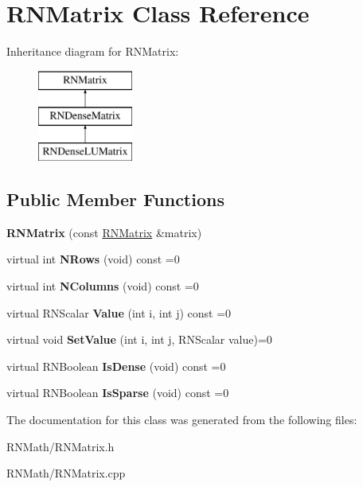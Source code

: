 \hypertarget{class_r_n_matrix}{}\section{R\+N\+Matrix Class Reference}
\label{class_r_n_matrix}
Inheritance diagram for R\+N\+Matrix\+:\begin{figure}[H]
\begin{center}
\leavevmode
\includegraphics[height=3.000000cm]{class_r_n_matrix}
\end{center}
\end{figure}
\subsection*{Public Member Functions}
\begin{DoxyCompactItemize}
\item 
{\bfseries R\+N\+Matrix} (const \hyperlink{class_r_n_matrix}{R\+N\+Matrix} \&matrix)\hypertarget{class_r_n_matrix_a98caf37cbca0dd338106f78c837d3841}{}\label{class_r_n_matrix_a98caf37cbca0dd338106f78c837d3841}

\item 
virtual int {\bfseries N\+Rows} (void) const  =0\hypertarget{class_r_n_matrix_ac6109cf146fa983646783ba2d96a990b}{}\label{class_r_n_matrix_ac6109cf146fa983646783ba2d96a990b}

\item 
virtual int {\bfseries N\+Columns} (void) const  =0\hypertarget{class_r_n_matrix_a822a97aa638e9efafd6a9aebfedec4f9}{}\label{class_r_n_matrix_a822a97aa638e9efafd6a9aebfedec4f9}

\item 
virtual R\+N\+Scalar {\bfseries Value} (int i, int j) const  =0\hypertarget{class_r_n_matrix_a30ef263fdb3f0b862d75936efc973e0f}{}\label{class_r_n_matrix_a30ef263fdb3f0b862d75936efc973e0f}

\item 
virtual void {\bfseries Set\+Value} (int i, int j, R\+N\+Scalar value)=0\hypertarget{class_r_n_matrix_a13fa141d8ec95da4c995e1f6560bb881}{}\label{class_r_n_matrix_a13fa141d8ec95da4c995e1f6560bb881}

\item 
virtual R\+N\+Boolean {\bfseries Is\+Dense} (void) const  =0\hypertarget{class_r_n_matrix_a2170e298be8da4b98048c5fa2a697225}{}\label{class_r_n_matrix_a2170e298be8da4b98048c5fa2a697225}

\item 
virtual R\+N\+Boolean {\bfseries Is\+Sparse} (void) const  =0\hypertarget{class_r_n_matrix_a2a3f31d19a4b60247a1403ddd710909c}{}\label{class_r_n_matrix_a2a3f31d19a4b60247a1403ddd710909c}

\end{DoxyCompactItemize}


The documentation for this class was generated from the following files\+:\begin{DoxyCompactItemize}
\item 
R\+N\+Math/R\+N\+Matrix.\+h\item 
R\+N\+Math/R\+N\+Matrix.\+cpp\end{DoxyCompactItemize}
